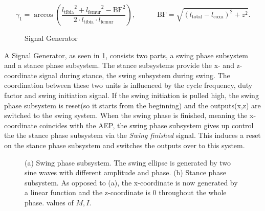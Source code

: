 \[
	\gamma_1 = \arccos(\frac{{l_\text{tibia}}^2 + {l_\text{femur}}^2 - {\text{BF}}^2}  {2 \cdot {l_\text{tibia}} \cdot {l_\text{femur}}}) ,\quad \quad \quad \text{BF} = \sqrt{(l_\text{total} - l_\text{coxa})^2 + z^2}.
\]








\begin{figure}[h]
	\centerline{}
	\caption{Signal Generator}
	\label{figure: Signal Generator}
\end{figure}

A Signal Generator, as seen in \ref{figure: Signal Generator}, consists two parts, a swing phase subsystem and a stance phase subsystem.
The stance subsystems provide the x- and z-coordinate signal during stance, the swing subsystem during swing.
The coordination between these two units is influenced by the cycle frequency, duty factor and swing initiation signal.
If the swing initiation is pulled high, the swing phase subsystem is reset(so it starts from the beginning) and the outputs(x,z) are switched to the swing system.
When the swing phase is finished, meaning the x-coordinate coincides with the AEP, the swing phase subsystem gives up control the the stance phase subsystem via the \textit{Swing finished} signal.
This induces a reset on the stance phase subsystem and switches the outputs over to this system.

\begin{figure}
	\centering
	\begin{subfigure}[b]{0.55\textwidth}
		
		\caption{}
		\label{fig:Ng1} 
	\end{subfigure}
	
	\begin{subfigure}[b]{0.55\textwidth}
		
		\caption{}
		\label{fig:Ng2}
	\end{subfigure}
	
	\caption[Swing and Stance Phase]{(a) Swing phase subsystem. The swing ellipse is generated by two sine waves with different amplitude and phase. (b) Stance phase subsystem. As opposed to (a), the x-coordinate is now generated by a linear function and the z-coordinate is 0 throughout the whole phase.
		values of $M,I$.}
\end{figure}




